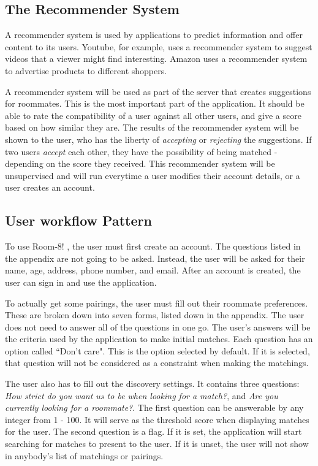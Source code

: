 \documentclass[journal]{./IEEE/IEEEtran}
\newcommand{\APPNAME}{Room-8! }
\begin{document}
\subsection{The Recommender System}
A recommender system is used by applications to predict information and offer content to its users\cite{katarya}.
Youtube, for example, uses a recommender system to suggest videos that a viewer might find interesting. Amazon uses a
recommender system to advertise products to different shoppers.

A recommender system will be used as part of the server that creates suggestions for roommates. This is the most
important part of the application. It should be able to rate the compatibility of a user against all other users, and
give a score based on how similar they are. The results of the recommender system will be shown to the user, who has the
liberty of \textit{accepting} or \textit{rejecting} the suggestions. If two users \textit{accept} each other, they have
the possibility of being matched - depending on the score they received. This recommender system will be unsupervised
and will run everytime a user modifies their account details, or a user creates an account.

\subsection{User workflow Pattern}

To use \APPNAME , the user must first create an account. The questions listed in the appendix are not going to be asked.
Instead, the user will be asked for their name, age, address, phone number, and email. After an account is created, the
user can sign in and use the application.

To actually get some pairings, the user must fill out their roommate preferences. These are broken down into seven
forms, listed down in the appendix. The user does not need to answer all of the questions in one go. The user's answers
will be the criteria used by the application to make initial matches. Each question has an option called ``Don't care".
This is the option selected by default. If it is selected, that question will not be considered as a constraint when
making the matchings.

The user also has to fill out the discovery settings. It contains three questions: \textit{How strict do you want us to
be when looking for a match?}, and \textit{Are you currently looking for a roommate?}. The first question can be
answerable by any integer from 1 - 100. It will serve as the threshold score when displaying matches for the user. The
second question is a flag. If it is set, the application will start searching for matches to present to the user. If it
is unset, the user will not show in anybody's list of matchings or pairings.
\end{document}
